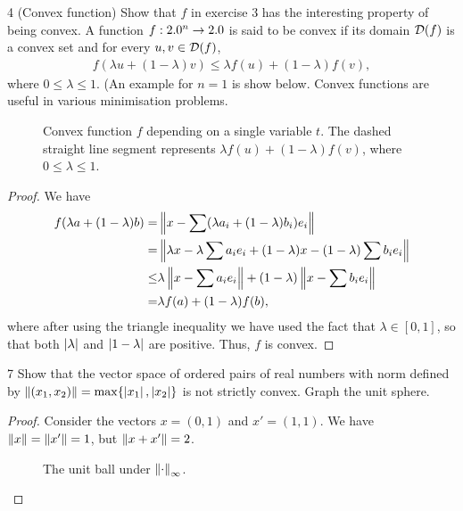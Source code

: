 \begin{exercise}{4 (Convex function)}
Show that $f$ in exercise 3 has the interesting property of being convex.
A function $f: 2.0^n \to 2.0$ is said to be convex if its domain $\mathcal{D}(f)$ is a convex set and for every $u, v \in \mathcal{D}(f)$,
\begin{align*}
    f(\lambda u + (1-\lambda) v) \leq \lambda f(u) + (1-\lambda) f(v),
\end{align*}
where $0 \leq \lambda \leq 1$.
(An example for $n = 1$ is show below.
Convex functions are useful in various minimisation problems.

\begin{figure}[H]
    \centering
    
    \caption{Convex function $f$ depending on a single variable $t$.
    The dashed straight line segment represents $\lambda f(u) + (1-\lambda) f(v)$, where $0 \leq \lambda \leq 1$.}
    \label{fig:sec6-2-ex4}
\end{figure}
\end{exercise}
\begin{proof}
We have
\begin{align*}
    f(\lambda a + (1-\lambda) b)
    =& \left\lVert x - \sum (\lambda a_i + (1-\lambda) b_i) e_i\right\rVert\\
    =& \left\lVert \lambda x - \lambda \sum a_i e_i
        + (1-\lambda) x - (1-\lambda) \sum b_i e_i\right\rVert\\
    \leq& \lambda \left\lVert x - \sum a_i e_i\right\rVert
        + (1-\lambda) \left\lVert x - \sum b_i e_i\right\rVert\\
    =& \lambda f(a) + (1-\lambda) f(b),
\end{align*}
where after using the triangle inequality we have used the fact that $\lambda \in [0,1]$, so that both $\left\lvert \lambda\right\rvert$ and $\left\lvert 1-\lambda\right\rvert$ are positive.
Thus, $f$ is convex.
\end{proof} 

\begin{exercise}{7}
Show that the vector space of ordered pairs of real numbers with norm defined by $\left\lVert (x_1, x_2)\right\rVert = \max\{\left\lvert x_1\right\rvert, \left\lvert x_2\right\rvert\}$ is not strictly convex.
Graph the unit sphere.
\end{exercise}
\begin{proof}
Consider the vectors $x = (0, 1)$ and $x' = (1, 1)$.
We have $\left\lVert x\right\rVert = \left\lVert x'\right\rVert = 1$, but $\left\lVert x + x'\right\rVert = 2$.

\begin{figure}[H]
    \centering
    
    \caption{The unit ball under $\left\lVert \cdot\right\rVert_\infty$.}
    \label{fig:sec6-2-ex7}
\end{figure}
\end{proof} 

